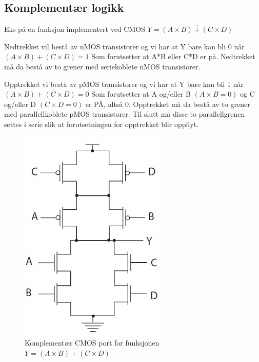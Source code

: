 \documentclass{article}
\begin{document}
	\subsection{Komplementær logikk}
	
	Eks på en funksjon implementert ved CMOS
	$Y = \overline{(A \times B) + (C \times D)}$
	
	Nedtrekket vil bestå av nMOS transistorer og vi har at Y bare kan bli 0 når $(A \times B) + (C \times D) = 1$ Som forutsetter at A*B eller C*D er på. Nedtrekket må da bestå av to grener med seriekoblete nMOS transistorer.
	
	Opptrekket vi bestå av pMOS transistorer og vi har at Y bare kan bli 1 når $(A \times B) + (C \times D) = 0$ Som forutsetter at A og/eller B $(A \times B = 0)$ og C og/eller D $(C \times D = 0)$ er PÅ, altså 0. Opptrekket må da bestå av to grener med	parallellkoblete pMOS transistorer. Til slutt må disse to parallellgrenen settes i serie slik at forutsetningen for opptrekket blir oppflyt.
	
	\begin{figure}[H]
		\includegraphics[scale = 0.6]{CMOSeks.jpg}
		\caption{Komplementær CMOS port for funksjonen $Y = \overline{(A \times B)+(C \times D)}$}
	\end{figure}
	
	
	
\end{document}
